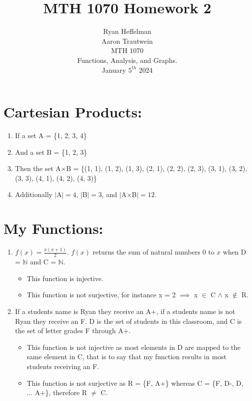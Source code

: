 \documentclass[16pt]{article}
\begin{document}
\Large
\date{}
\title{MTH 1070 Homework 2}
\author{Ryan Heffelman\\Aaron Trautwein \\
MTH 1070 \\Functions, Analysis, and Graphs. \\ January \(5^{th}\) 2024} 
\maketitle

\section{Cartesian Products:}
\begin{enumerate}
    \item If a set A = \{1, 2, 3, 4\}
    \item And a set B = \{1, 2, 3\}
    \item Then the set A\(\times\)B = \{(1, 1), (1, 2), (1, 3), (2, 1), (2, 2), (2, 3), (3, 1), (3, 2), (3, 3), (4, 1), (4, 2), (4, 3)\}
    \item Additionally \(\vert \)A\(\vert = 4\), \(\vert\)B\(\vert = 3\), and \(\vert\)A\(\times\)B\(\vert = 12\).
\end{enumerate}
\section{My Functions:}
\begin{enumerate}
    \item $f(x) = \frac{x(x+1)}{2}$. $f(x)$ returns the sum of natural numbers 0 to $x$ when D = $\mathbb{N}$ and C = $\mathbb{N}$.
    \begin{itemize}
        \item This function is injective.
        \item This function is not surjective, for instance x = 2 \(\implies\) x \(\in\) C \(\land\) x \(\notin\) R.
    \end{itemize}
    \item If a students name is Ryan they receive an A+, if a students name is not Ryan they receive an F. D is the set of students in this classroom, and C is the set of letter grades F through A+.
    \begin{itemize}
        \item This function is not injective as most elements in D are mapped to the same element in C, that is to say that my function results in most students receiving an F.
        \item This function is not surjective as R = \{F, A+\} whereas C = \{F, D-, D, ... A+\}, therefore R \(\neq\) C.
    \end{itemize}
\end{enumerate}
\end{document}
